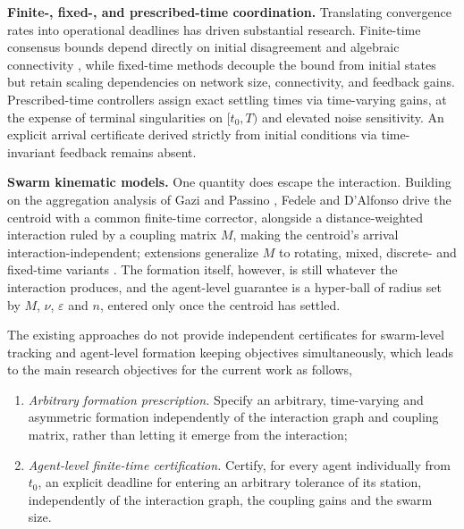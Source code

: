 \documentclass[letterpaper, 10 pt, conference]{ieeeconf}
\begin{document}
\noindent
\textbf{Finite-, fixed-, and prescribed-time coordination.} Translating convergence rates into operational deadlines has driven substantial research. Finite-time consensus bounds depend directly on initial disagreement and algebraic connectivity \cite{wang2010finite}, while fixed-time methods \cite{polyakov2012nonlinear,zhou2022fixed,trinh2022finite} decouple the bound from initial states but retain scaling dependencies on network size, connectivity, and feedback gains. Prescribed-time controllers \cite{song2017time,song2023prescribed} assign exact settling times via time-varying gains, at the expense of terminal singularities on $[t_0, T)$ and elevated noise sensitivity. An explicit arrival certificate derived strictly from initial conditions via time-invariant feedback remains absent.

\noindent
\textbf{Swarm kinematic models.} One quantity does escape the
interaction. Building on the aggregation analysis of Gazi and Passino
\cite{gazi2003stability}, Fedele and D'Alfonso
\cite{fedele2019kinematic} drive the centroid with a common
finite-time corrector, alongside a distance-weighted interaction ruled
by a coupling matrix $M$, making the centroid's arrival
interaction-independent; extensions generalize $M$ to rotating, mixed,
discrete- and fixed-time variants
\cite{fedele2021mixing,fedele2020discrete}. The formation itself,
however, is still whatever the interaction produces, and the
agent-level guarantee is a hyper-ball of radius set by $M$, $\nu$,
$\varepsilon$ and $n$, entered only once the centroid has settled.

\noindent 
The existing approaches do not provide independent certificates for swarm-level tracking and agent-level formation keeping objectives simultaneously, which leads to the main research objectives for the current work as follows, 
\begin{enumerate}
\item \emph{Arbitrary formation prescription.} Specify an arbitrary,
      time-varying and asymmetric formation independently of the
      interaction graph and coupling matrix, rather than letting it
      emerge from the interaction;
\item \emph{Agent-level finite-time certification.} Certify, for every
      agent individually from $t_0$, an explicit deadline for entering
      an arbitrary tolerance of its station, independently of the
      interaction graph, the coupling gains and the swarm size.
\end{enumerate}
\end{document}
